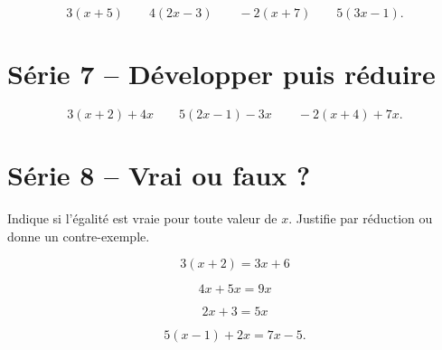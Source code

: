 \documentclass[12pt,a4paper]{article}
\begin{document}
\[
3(x+5) \qquad 4(2x-3) \qquad -2(x+7)
\qquad 5(3x-1).
\]

\section*{Série 7 -- Développer puis réduire}

\[
3(x+2)+4x
\qquad
5(2x-1)-3x
\qquad
-2(x+4)+7x.
\]

\section*{Série 8 -- Vrai ou faux ?}

Indique si l'égalité est vraie pour toute valeur de \(x\).
Justifie par réduction ou donne un contre-exemple.

\[
3(x+2)=3x+6
\]

\[
4x+5x=9x
\]

\[
2x+3=5x
\]

\[
5(x-1)+2x=7x-5.
\]
\end{document}
